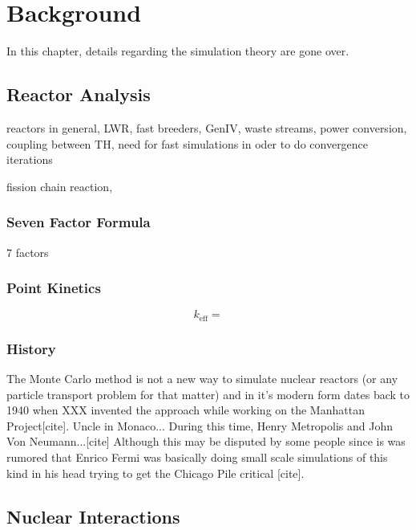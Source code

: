 \chapter{Background}

In this chapter, details regarding the simulation theory are gone over.  

\section{Reactor Analysis}

reactors in general, LWR, fast breeders, GenIV, waste streams, power conversion, coupling between TH, need for fast simulations in oder to do convergence iterations

fission chain reaction, 

\subsection{Seven Factor Formula}
 7 factors

\subsection{Point Kinetics}

\begin{equation}
\label{keff}
k_\mathrm{eff} = 
\end{equation}







\subsection{History}

The Monte Carlo method is not a new way to simulate nuclear reactors (or any particle transport problem for that matter) and in it's modern form dates back to 1940 when XXX invented the approach while working on the Manhattan Project[cite]. Uncle in Monaco...  During this time, Henry Metropolis and John Von Neumann...[cite]  Although this may be disputed by some people since is was rumored that Enrico Fermi was basically doing small scale simulations of this kind in his head trying to get the Chicago Pile critical [cite].


\section{Nuclear Interactions}
\label{subsec:interactions}

